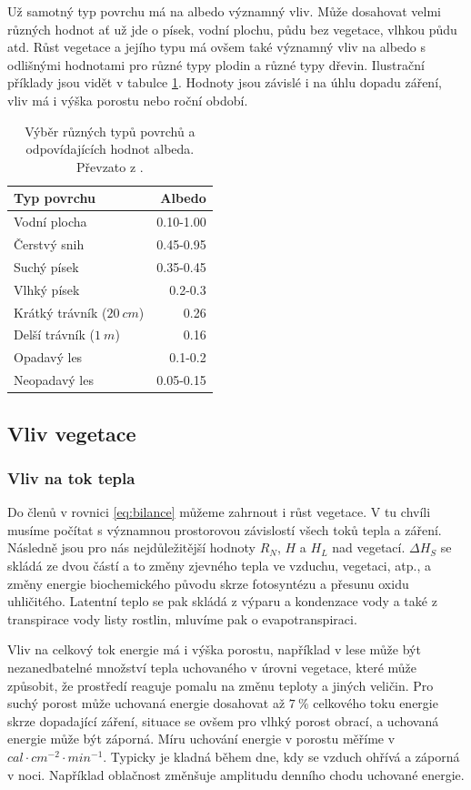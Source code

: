Už samotný typ povrchu má na albedo významný vliv. Může dosahovat velmi různých hodnot ať už jde o písek, vodní plochu, půdu bez vegetace, vlhkou půdu atd. Růst vegetace a jejího typu má ovšem také významný vliv na albedo s odlišnými hodnotami pro různé typy plodin a různé typy dřevin. Ilustrační příklady jsou vidět v tabulce \ref{tab:albedo}. Hodnoty jsou závislé i na úhlu dopadu záření, vliv má i výška porostu nebo roční období\cite{arya2001,alma}.

\begin{table}
\centering\footnotesize\sf
\begin{tabular}{lr}
\toprule
Typ povrchu & Albedo \\
\midrule
Vodní plocha & 0.10-1.00 \\
Čerstvý snih & 0.45-0.95 \\
Suchý písek & 0.35-0.45\\
Vlhký písek & 0.2-0.3\\
Krátký trávník ($\SI{20}{cm}$) & 0.26\\
Delší trávník ($\SI{1}{m}$) & 0.16\\
Opadavý les & 0.1-0.2\\
Neopadavý les & 0.05-0.15\\
\bottomrule
\end{tabular}
	\caption{Výběr různých typů povrchů a odpovídajících hodnot albeda. Převzato z \cite{arya2001}.}
\label{tab:albedo}
\end{table}


\subsection{Vliv vegetace} \label{chap:veg}
\subsubsection{Vliv na tok tepla}
Do členů v rovnici \ref{eq:bilance} můžeme zahrnout i růst vegetace. V tu chvíli musíme počítat s významnou prostorovou závislostí všech toků tepla a záření. Následně jsou pro nás nejdůležitější hodnoty $R_N$, $H$ a $H_L$ nad vegetací. $\Delta H_S$ se skládá ze dvou částí a to změny zjevného tepla ve vzduchu, vegetaci, atp., a změny energie biochemického původu skrze fotosyntézu a přesunu oxidu uhličitého. Latentní teplo se pak skládá z výparu a kondenzace vody a také z transpirace vody listy rostlin, mluvíme pak o evapotranspiraci\cite{arya2001}. 

Vliv na celkový tok energie má i výška porostu, například v lese může být nezanedbatelné množství tepla uchovaného v úrovni vegetace, které může způsobit, že prostředí reaguje pomalu na změnu teploty a jiných veličin. Pro suchý porost může uchovaná energie dosahovat až $\SI{7}{\%}$ celkového toku energie skrze dopadající záření, situace se ovšem pro vlhký porost obrací, a uchovaná energie může být záporná. Míru uchování energie v porostu měříme v $\si{}{cal\cdot cm^{-2}\cdot min^{-1}}$. Typicky je kladná během dne, kdy se vzduch ohřívá a záporná v noci. Například oblačnost změnšuje amplitudu denního chodu uchované energie\cite{alma}. 

